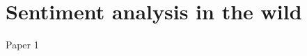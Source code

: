 \documentclass[
  10pt,
  ignorenonframetext,
  aspectratio=169]{beamer}
\newif\ifbibliography
\begin{document}
\hypertarget{sentiment-analysis-in-the-wild}{%
\section{Sentiment analysis in the
wild}\label{sentiment-analysis-in-the-wild}}

\begin{frame}{Paper 1}
\protect\hypertarget{paper-1}{}
\end{frame}

\begin{frame}[allowframebreaks]{}
  \bibliographytrue
  
\end{frame}
\end{document}

